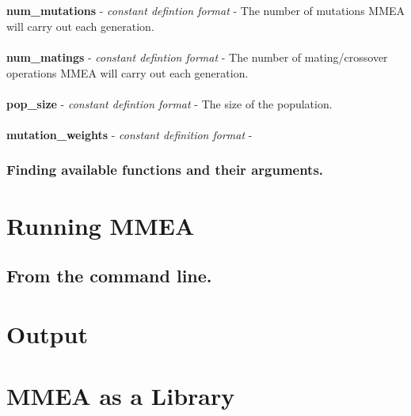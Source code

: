 \documentclass{article}
\begin{document}
\\
\\
\textbf{num\_mutations} - \textit{constant defintion format} - The number of mutations MMEA will carry out each generation.
\\
\\
\textbf{num\_matings} - \textit{constant defintion format} - The number of mating/crossover operations MMEA will carry out each generation.
\\
\\
\textbf{pop\_size} - \textit{constant defintion format} - The size of the population.
\\
\\
\textbf{mutation\_weights} - \textit{constant definition format} - 

\subsubsection{Finding available functions and their arguments.}

\section{Running MMEA}

\subsection{From the command line.}


\section{Output}

\section{MMEA as a Library}
\end{document}
